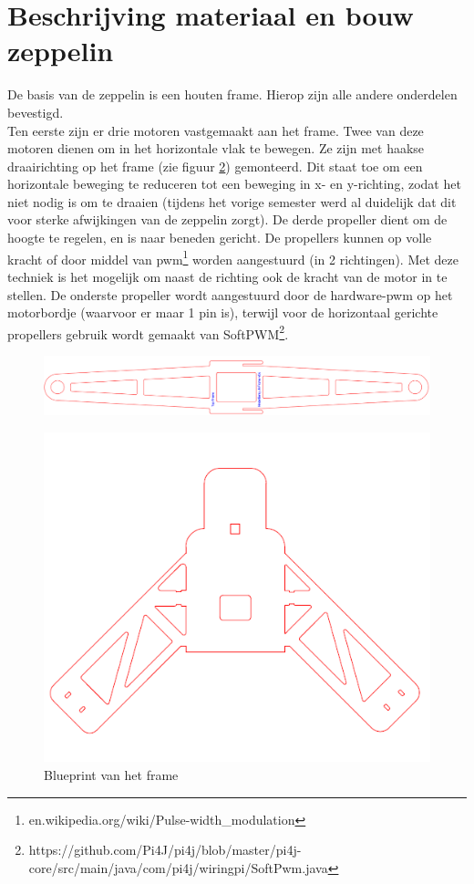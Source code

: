 \documentclass[eind]{penoverslag}
\begin{document}
\section{Beschrijving materiaal en bouw zeppelin}
De basis van de zeppelin is een houten frame. Hierop zijn alle andere onderdelen bevestigd.\\
Ten eerste zijn er drie motoren vastgemaakt aan het frame. Twee van deze motoren dienen om in het horizontale vlak te bewegen. Ze zijn met haakse draairichting op het frame (zie figuur \ref{frame}) gemonteerd. Dit staat toe om een horizontale beweging te reduceren tot een beweging in x- en y-richting, zodat het niet nodig is om te draaien (tijdens het vorige semester werd al duidelijk dat dit voor sterke afwijkingen van de zeppelin zorgt). De derde propeller dient om de hoogte te regelen, en is naar beneden gericht. De propellers kunnen op volle kracht of door middel van pwm\footnote{en.wikipedia.org/wiki/Pulse-width\_modulation} worden aangestuurd (in 2 richtingen). Met deze techniek is het mogelijk om naast de richting ook de kracht van de motor in te stellen. De onderste propeller wordt aangestuurd door de hardware-pwm op het motorbordje (waarvoor er maar 1 pin is), terwijl voor de horizontaal gerichte propellers gebruik wordt gemaakt van SoftPWM\footnote{https://github.com/Pi4J/pi4j/blob/master/pi4j-core/src/main/java/com/pi4j/wiringpi/SoftPwm.java}. ~\\

\begin{figure}[h!]
\centering
\includegraphics[scale=0.3]{upperFrame.png}
\label{frame}
\end{figure}

\begin{figure}[h!]
\centering
\includegraphics[scale=0.4]{lowerFrame.png}
\caption{Blueprint van het frame}
\label{frame}
\end{figure}
\end{document}
